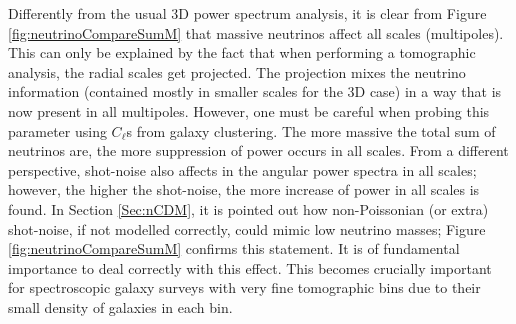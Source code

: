 \qquad Differently from the usual 3D power spectrum analysis, it is clear from Figure \ref{fig:neutrinoCompareSumM} that massive neutrinos affect all scales (multipoles). This can only be explained by the fact that when performing a tomographic analysis, the radial scales get projected. The projection mixes the neutrino information (contained mostly in smaller scales for the 3D case) in a way that is now present in all multipoles. However, one must be careful when probing this parameter using $C_{\ell}$s from galaxy clustering. The more massive the total sum of neutrinos are, the more suppression of power occurs in all scales. From a different perspective, shot-noise also affects in the angular power spectra in all scales; however, the higher the shot-noise, the more increase of power in all scales is found. In Section \ref{Sec:nCDM}, it is pointed out how non-Poissonian (or extra) shot-noise, if not modelled correctly, could mimic low neutrino masses; Figure \ref{fig:neutrinoCompareSumM} confirms this statement. It is of fundamental importance to deal correctly with this effect. This becomes crucially important for spectroscopic galaxy surveys with very fine tomographic bins due to their small density of galaxies in each bin.


